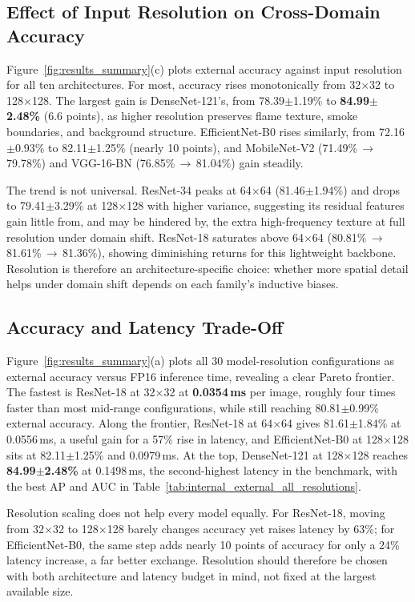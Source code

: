 \documentclass[conference]{IEEEtran}
\begin{document}
\subsection{Effect of Input Resolution on Cross-Domain Accuracy}

Figure~\ref{fig:results_summary}(c) plots external accuracy against input resolution for all ten architectures. For most, accuracy rises monotonically from 32$\times$32 to 128$\times$128. The largest gain is DenseNet-121's, from 78.39$\pm$1.19\% to \textbf{84.99$\pm$2.48\%} (6.6 points), as higher resolution preserves flame texture, smoke boundaries, and background structure. EfficientNet-B0 rises similarly, from 72.16$\pm$0.93\% to 82.11$\pm$1.25\% (nearly 10 points), and MobileNet-V2 (71.49\%\,$\to$\,79.78\%) and VGG-16-BN (76.85\%\,$\to$\,81.04\%) gain steadily.

The trend is not universal. ResNet-34 peaks at 64$\times$64 (81.46$\pm$1.94\%) and drops to 79.41$\pm$3.29\% at 128$\times$128 with higher variance, suggesting its residual features gain little from, and may be hindered by, the extra high-frequency texture at full resolution under domain shift. ResNet-18 saturates above 64$\times$64 (80.81\%\,$\to$\,81.61\%\,$\to$\,81.36\%), showing diminishing returns for this lightweight backbone. Resolution is therefore an architecture-specific choice: whether more spatial detail helps under domain shift depends on each family's inductive biases.

\subsection{Accuracy and Latency Trade-Off}

Figure~\ref{fig:results_summary}(a) plots all 30 model-resolution configurations as external accuracy versus FP16 inference time, revealing a clear Pareto frontier. The fastest is ResNet-18 at 32$\times$32 at \textbf{0.0354\,ms} per image, roughly four times faster than most mid-range configurations, while still reaching 80.81$\pm$0.99\% external accuracy. Along the frontier, ResNet-18 at 64$\times$64 gives 81.61$\pm$1.84\% at 0.0556\,ms, a useful gain for a 57\% rise in latency, and EfficientNet-B0 at 128$\times$128 sits at 82.11$\pm$1.25\% and 0.0979\,ms. At the top, DenseNet-121 at 128$\times$128 reaches \textbf{84.99$\pm$2.48\%} at 0.1498\,ms, the second-highest latency in the benchmark, with the best AP and AUC in Table~\ref{tab:internal_external_all_resolutions}.

Resolution scaling does not help every model equally. For ResNet-18, moving from 32$\times$32 to 128$\times$128 barely changes accuracy yet raises latency by 63\%; for EfficientNet-B0, the same step adds nearly 10 points of accuracy for only a 24\% latency increase, a far better exchange. Resolution should therefore be chosen with both architecture and latency budget in mind, not fixed at the largest available size.
\end{document}
